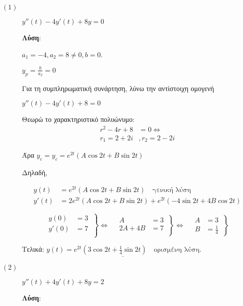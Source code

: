 \documentclass[a4paper,12pt]{article}
\begin{document}
\begin{description}

\item [$(1)$] $\boxed{y''(t)-4y'(t) +8y=0}$

\textbf{Λύση}:

\vspace{\baselineskip}

$a_1=-4, a_2=8\neq 0, b=0$.

$y_p=\frac{b}{a_2}=0$

Για τη συμπληρωματική συνάρτηση, λύνω την αντίστοιχη ομογενή

$y''(t)-4y'(t) + 8 = 0$

Θεωρώ το χαρακτηριστικό πολυώνυμο:
\begin{align*}
r^2-4r+8&=0 \Leftrightarrow \\
r_1=2+2i&, r_2 = 2-2i
\end{align*}

Άρα $y_c=y_c=e^{2t}(A\cos 2t +B\sin 2t)$

Δηλαδή,

\begin{align*}
y(t) &= e^{2t}(A\cos 2t +B\sin 2t) \quad \text{γενική λύση} \\
y'(t) &= 2e^{2t}(A\cos 2t +B\sin 2t)+e^{2t}(-4\sin 2t + 4B\cos 2t)
\end{align*}

\[
  \left.\begin{aligned}
y(0)&=3 \\
y'(0)&=7\\
  \end{aligned}\:\right\}\Leftrightarrow \quad
 \left.\begin{aligned}
A&=3\\
2A+4B&=7\\
  \end{aligned}\:\right\}\Leftrightarrow \quad
 \left.\begin{aligned}
A&=3\\
B&=\frac{1}{4}
  \end{aligned}\:\right\}
\]


Τελικά: $\underline{y(t) = e^{2t}(3\cos 2t +\frac{1}{4}\sin 2t) \quad \text{ορισμένη λύση}}$.

\vspace{\baselineskip}



\item [$(2)$] $\boxed{y''(t)+4y'(t) +8y=2}$

\textbf{Λύση}:


\end{description}
\end{document}
